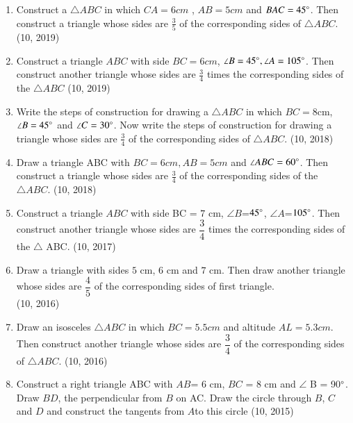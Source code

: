 \begin{enumerate}[label=\thesubsection.\arabic*,ref=\thesubsection.\theenumi]
\item Construct a $\triangle ABC$ in which $CA = 6cm$ , $AB = 5cm$ and $BAC= 45\degree$. Then  construct a triangle whose sides are $\frac{3}{5}$ of the corresponding sides of $\triangle ABC$.
		\hfill (10, 2019)
\item Construct a triangle $ABC$ with side $BC = 6 cm$, $\angle B=45\degree, \angle A= 105\degree$. Then construct another triangle whose sides are $\frac{3}{4}$ times the corresponding sides of the $\triangle ABC$
		\hfill (10, 2019)
\item Write the steps of construction for drawing a $\triangle ABC$ in which $BC=8$cm, $\angle B=45\degree{}$ and $\angle C= 30\degree{}$. Now write the steps of construction for drawing a triangle whose sides are $\frac{3}{4}$ of the corresponding sides of $\triangle ABC$.
		\hfill (10, 2018)
	\item Draw a triangle ABC with $BC=6 cm, AB=5 cm$ and $\angle{ABC}=60\degree$. Then construct a triangle whose sides are $\frac{3}{4}$ of the corresponding sides of the $\triangle ABC$.
		\hfill (10, 2018)
\item Construct a triangle $ABC$ with side BC = $7$ cm, $\angle{B}$=$45\degree$, $\angle{A}$=$105\degree$. Then construct another triangle whose sides are  $\dfrac{3}{4}$  times the corresponding sides of the $\triangle$ ABC.
		\hfill (10, 2017)
\item Draw a triangle with sides $5$ cm, $6$ cm and $7$ cm. Then draw another triangle whose sides are $\dfrac{4}{5}$ of the corresponding sides of first triangle.\\
		\hfill (10, 2016)
\item Draw an isosceles $\triangle ABC$ in which $BC=5.5 cm$ and altitude $AL=5.3 cm$. Then construct another triangle whose sides are $\dfrac{3}{4}$ of the corresponding sides of $\triangle ABC$.
		\hfill (10, 2016)
     \item Construct a right triangle ABC with $AB$= $6$ cm, $BC$ = $8$ cm and $\angle$ B = 90$\degree$. Draw $BD$, the perpendicular from $B$ on AC. Draw the circle through $B$, $C$ and $D$ and construct the tangents from $A$to this circle
		\hfill (10, 2015)


\end{enumerate}
